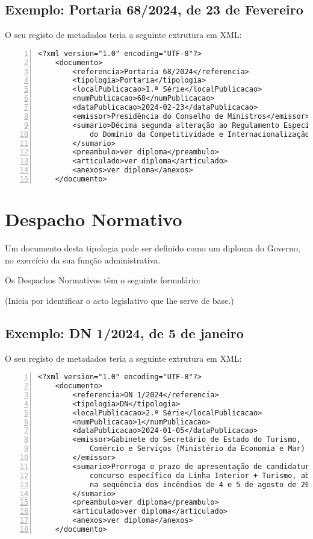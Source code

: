 \subsection{Exemplo: Portaria 68/2024, de 23 de Fevereiro} 
    
O seu registo de metadados teria a seguinte extrutura em XML:
    
\begin{Verbatim}[frame=single, numbers=left, fontsize=\small, commandchars=\\\{\}]
<?xml version="1.0" encoding="UTF-8"?>
    <documento>
        <referencia>Portaria 68/2024</referencia>
        <tipologia>Portaria</tipologia>
        <localPublicacao>1.ª Série</localPublicacao>
        <numPublicacao>68</numPublicacao>
        <dataPublicacao>2024-02-23</dataPublicacao>
        <emissor>Presidência do Conselho de Ministros</emissor>
        <sumario>Décima segunda alteração ao Regulamento Específico 
            do Domínio da Competitividade e Internacionalização
        </sumario>
        <preambulo>ver diploma</preambulo>
        <articulado>ver diploma</articulado>
        <anexos>ver diploma</anexos>
    </documento>
\end{Verbatim}


\section{Despacho Normativo}

Um documento desta tipologia pode ser definido como um diploma do Governo, 
no exercício da sua função administrativa. 

Os Despachos Normativos têm o seguinte formulário:

\begin{quoting}
    (Inicia por identificar o acto legislativo que lhe serve de base.)
\end{quoting}


\subsection{Exemplo: DN 1/2024, de 5 de janeiro} 
    
O seu registo de metadados teria a seguinte extrutura em XML:
    
\begin{Verbatim}[frame=single, numbers=left, fontsize=\small, commandchars=\\\{\}]
<?xml version="1.0" encoding="UTF-8"?>
    <documento>
        <referencia>DN 1/2024</referencia>
        <tipologia>DN</tipologia>
        <localPublicacao>2.ª Série</localPublicacao>
        <numPublicacao>1</numPublicacao>
        <dataPublicacao>2024-01-05</dataPublicacao>
        <emissor>Gabinete do Secretário de Estado do Turismo, 
            Comércio e Serviços (Ministério da Economia e Mar)
        </emissor>
        <sumario>Prorroga o prazo de apresentação de candidaturas ao 
            concurso específico da Linha Interior + Turismo, aberto 
            na sequência dos incêndios de 4 e 5 de agosto de 2023
        </sumario>
        <preambulo>ver diploma</preambulo>
        <articulado>ver diploma</articulado>
        <anexos>ver diploma</anexos>
    </documento>
\end{Verbatim}


